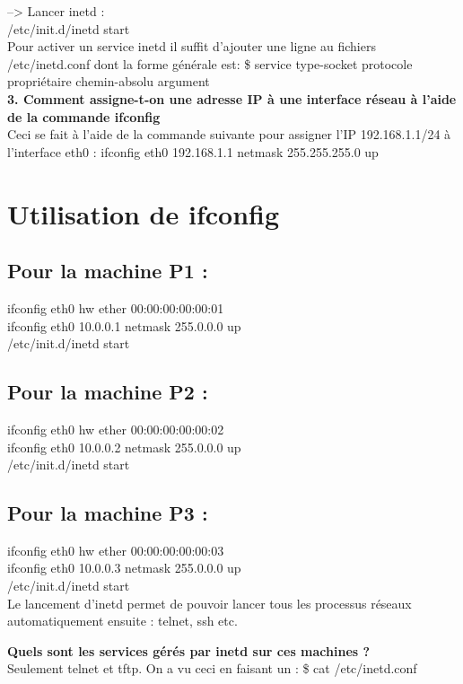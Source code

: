 \documentclass[a4paper]{article}
\begin{document}
--> Lancer inetd : \\
 /etc/init.d/inetd start \\
 
 Pour activer un service inetd il suffit d'ajouter une ligne au fichiers /etc/inetd.conf dont la forme générale est: \$ service type-socket protocole propriétaire chemin-absolu argument \\
 

\textbf{3. Comment assigne-t-on une adresse IP à une interface réseau à l'aide de la commande ifconfig} \\

Ceci se fait à l'aide de la commande suivante pour assigner l'IP 192.168.1.1/24 à l'interface eth0 : ifconfig eth0 192.168.1.1 netmask 255.255.255.0 up


	\section{Utilisation de ifconfig}
		\subsection{Pour la machine P1 :}
\noindent
ifconfig eth0 hw ether 00:00:00:00:00:01 \\
ifconfig eth0 10.0.0.1 netmask 255.0.0.0 up \\
/etc/init.d/inetd start 

		\subsection{Pour la machine P2 :}
\noindent		
ifconfig eth0 hw ether 00:00:00:00:00:02 \\
ifconfig eth0 10.0.0.2 netmask 255.0.0.0 up \\
/etc/init.d/inetd start	
		
		\subsection{Pour la machine P3 :}
\noindent		
ifconfig eth0 hw ether 00:00:00:00:00:03 \\
ifconfig eth0 10.0.0.3 netmask 255.0.0.0 up \\
/etc/init.d/inetd start 	\\

Le lancement d'inetd permet de pouvoir lancer tous les processus réseaux automatiquement ensuite : telnet, ssh etc.

\textbf{Quels sont les services gérés par inetd sur ces machines ?} \\
Seulement telnet et tftp. On a vu ceci en faisant un : \$ cat /etc/inetd.conf
		
\end{document}
